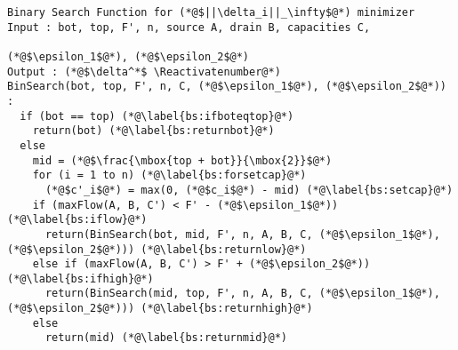 \Suppressnumber
\begin{lstlisting}[label=binsearch, style=numbers]
Binary Search Function for (*@$||\delta_i||_\infty$@*) minimizer
Input : bot, top, F', n, source A, drain B, capacities C,
                                                      (*@$\epsilon_1$@*), (*@$\epsilon_2$@*)
Output : (*@$\delta^*$ \Reactivatenumber@*)
BinSearch(bot, top, F', n, C, (*@$\epsilon_1$@*), (*@$\epsilon_2$@*)) :
  if (bot == top) (*@\label{bs:ifboteqtop}@*)
    return(bot) (*@\label{bs:returnbot}@*)
  else
    mid = (*@$\frac{\mbox{top + bot}}{\mbox{2}}$@*)
    for (i = 1 to n) (*@\label{bs:forsetcap}@*)
      (*@$c'_i$@*) = max(0, (*@$c_i$@*) - mid) (*@\label{bs:setcap}@*)
    if (maxFlow(A, B, C') < F' - (*@$\epsilon_1$@*)) (*@\label{bs:iflow}@*)
      return(BinSearch(bot, mid, F', n, A, B, C, (*@$\epsilon_1$@*), (*@$\epsilon_2$@*))) (*@\label{bs:returnlow}@*)
    else if (maxFlow(A, B, C') > F' + (*@$\epsilon_2$@*)) (*@\label{bs:ifhigh}@*)
      return(BinSearch(mid, top, F', n, A, B, C, (*@$\epsilon_1$@*), (*@$\epsilon_2$@*))) (*@\label{bs:returnhigh}@*)
    else
      return(mid) (*@\label{bs:returnmid}@*)
\end{lstlisting}
